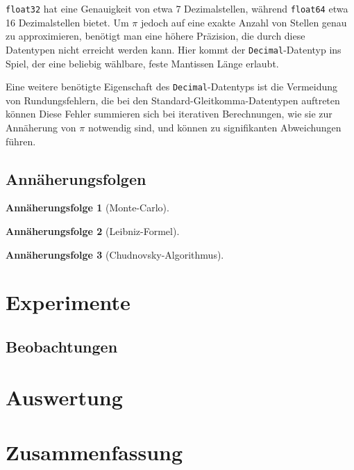 \documentclass{scrartcl}
\newtheorem{approximation sequence}{Annäherungsfolge}
\begin{document}
\texttt{float32} hat eine Genauigkeit von etwa 7 Dezimalstellen, während \texttt{float64} etwa 16 Dezimalstellen bietet.
Um \(\pi\) jedoch auf eine exakte Anzahl von Stellen genau zu approximieren,
benötigt man eine höhere Präzision, die durch diese Datentypen nicht erreicht
werden kann.
Hier kommt der \texttt{Decimal}-Datentyp ins Spiel, der eine beliebig wählbare,
feste Mantissen Länge erlaubt.

Eine weitere benötigte Eigenschaft des \texttt{Decimal}-Datentyps ist die
Vermeidung von Rundungsfehlern, die bei den Standard-Gleitkomma-Datentypen
auftreten können Diese Fehler summieren sich bei iterativen Berechnungen, wie
sie zur Annäherung von \(\pi\) notwendig sind, und können zu signifikanten
Abweichungen führen.

\subsection{Annäherungsfolgen}

\begin{approximation sequence}[Monte-Carlo]

\end{approximation sequence}

\begin{approximation sequence}[Leibniz-Formel]

\end{approximation sequence}

\begin{approximation sequence}[Chudnovsky-Algorithmus]

\end{approximation sequence}

\section{Experimente}

\subsection{Beobachtungen}

\section{Auswertung}

\section{Zusammenfassung}

\printbibliography
\end{document}
